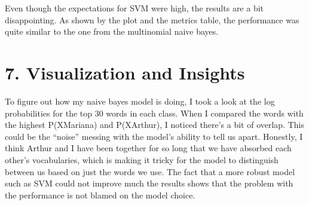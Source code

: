 \documentclass[11pt]{article}
\begin{document}
    \begin{center}
    \end{center}
    { \hspace*{\fill} \\}
    
    \begin{center}
    \end{center}
    { \hspace*{\fill} \\}
    
    Even though the expectations for SVM were high, the results are a bit
disappointing. As shown by the plot and the metrics table, the
performance was quite similar to the one from the multinomial naive
bayes.

    \section{7. Visualization and
Insights}\label{visualization-and-insights}

    To figure out how my naive bayes model is doing, I took a look at the
log probabilities for the top 30 words in each class. When I compared
the words with the highest P(X\textbar Mariana) and P(X\textbar Arthur),
I noticed there's a bit of overlap. This could be the ``noise'' messing
with the model's ability to tell us apart. Honestly, I think Arthur and
I have been together for so long that we have absorbed each other's
vocabularies, which is making it tricky for the model to distinguish
between us based on just the words we use. The fact that a more robust
model such as SVM could not improve much the results shows that the
problem with the performance is not blamed on the model choice.
\end{document}
